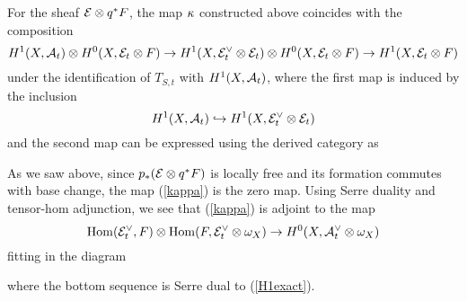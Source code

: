 \documentclass[letterpaper,10pt]{article}
\theoremstyle{remark}
\begin{document}
For the sheaf $\mathcal{E} \otimes q^*F$, the map $\kappa$ constructed above coincides with the composition
\begin{equation}\label{kappa}
H^1(X, \mathcal{A}_t) \otimes H^0(X, \mathcal{E}_t \otimes F) \to H^1(X, \mathcal{E}_t^\vee \otimes \mathcal{E}_t) \otimes H^0(X, \mathcal{E}_t \otimes F) \to H^1(X, \mathcal{E}_t \otimes F)
\end{equation}
under the identification of $T_{S,t}$ with $H^1(X, \mathcal{A}_t)$, where the first map is induced by the inclusion 
\[ H^1(X, \mathcal{A}_t) \hookrightarrow H^1(X, \mathcal{E}_t^\vee \otimes \mathcal{E}_t) \] 
and the second map can be expressed using the derived category as
\begin{center}
\end{center}
As we saw above, since $p_*(\mathcal{E} \otimes q^*F)$ is locally free and its formation commutes with base change, the map (\ref{kappa}) is the zero map. Using Serre duality and tensor-hom adjunction, we see that (\ref{kappa}) is adjoint to the map
\[ \mathrm{Hom}(\mathcal{E}_t^\vee, F) \otimes \mathrm{Hom}(F, \mathcal{E}_t^\vee \otimes \omega_X) \to H^0(X, \mathcal{A}_t^\vee \otimes \omega_X) \]
fitting in the diagram
\begin{center}
\end{center}
where the bottom sequence is Serre dual to (\ref{H1exact}).
\end{document}
